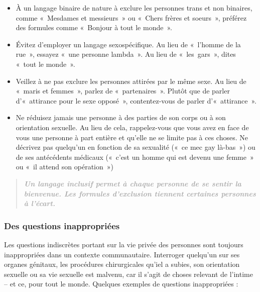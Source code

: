 \documentclass[12pt,openany]{book}
\begin{document}
\begin{itemize}[label=\textbullet, leftmargin=*]
\setlength\itemsep{-0.3em}
\item À un langage binaire de nature à exclure les personnes trans et non binaires, comme \mbox{« M}esdames et messieur\mbox{s »} ou \mbox{« C}hers frères et soeur\mbox{s »}, préférez des formules comme \mbox{« B}onjour à tout le mond\mbox{e »}.
\item Évitez d’employer un langage sexospécifique. Au lieu de \mbox{« l}’homme de la ru\mbox{e »}, essayez \mbox{« u}ne personne lambd\mbox{a »}. Au lieu de \mbox{« les gars »}, dites \mbox{« t}out le mond\mbox{e »}.
\item Veillez à ne pas exclure les personnes attirées par le même sexe. Au lieu de \mbox{« m}aris et femme\mbox{s »}, parlez de \mbox{« partenaires »}. Plutôt que de parler d’\mbox{« a}ttirance pour le sexe oppos\mbox{é »}, contentez-vous de parler d’\mbox{« attirance »}.
\item Ne réduisez jamais une personne à des parties de son corps ou à son orientation sexuelle. Au lieu de cela, rappelez-vous que vous avez en face de vous une personne à part entière et qu’elle ne se limite pas à ces choses. Ne décrivez pas quelqu’un en fonction de sa sexualité (\mbox{« c}e mec gay là-ba\mbox{s »}) ou de ses antécédents médicaux (\mbox{« c}’est un homme qui est devenu une femm\mbox{e »} ou \mbox{« i}l attend son opératio\mbox{n »})
\end{itemize}

\begingroup
\addtolength\leftmargin{-0.1in}
\begin{quote}
\centering
\textit{\large \textbf{\textcolor{darkgray}{Un langage inclusif permet à chaque personne de se sentir la bienvenue. Les formules d’exclusion tiennent certaines personnes à l’écart.}}}
\end{quote}
\endgroup

\subsubsection*{Des questions inappropriées}

\noindent Les questions indiscrètes portant sur la vie privée des personnes sont toujours inappropriées dans un contexte communautaire. Interroger quelqu’un sur ses organes génitaux, les procédures chirurgicales qu’iel a subies, son orientation sexuelle ou sa vie sexuelle est malvenu, car il s’agit de choses relevant de l’intime – et ce, pour tout le monde.
Quelques exemples de questions inappropriées :
\end{document}
